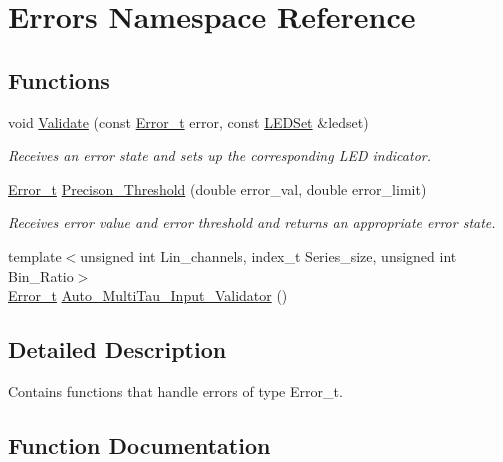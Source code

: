 \hypertarget{namespaceErrors}{}\section{Errors Namespace Reference}
\label{namespaceErrors}
\subsection*{Functions}
\begin{DoxyCompactItemize}
\item 
void \hyperlink{namespaceErrors_a8f082a1fb43d231480a51452d20a60ad}{Validate} (const \hyperlink{errors_8hpp_a4e8c0d09726859e3d3369c0da5a1aa7f}{Error\+\_\+t} error, const \hyperlink{classLEDSet}{L\+E\+D\+Set} \&ledset)
\begin{DoxyCompactList}\small\item\em Receives an error state and sets up the corresponding L\+ED indicator. \end{DoxyCompactList}\item 
\hyperlink{errors_8hpp_a4e8c0d09726859e3d3369c0da5a1aa7f}{Error\+\_\+t} \hyperlink{namespaceErrors_a13171d3d324164c9f7a9508d5a16b0c5}{Precison\+\_\+\+Threshold} (double error\+\_\+val, double error\+\_\+limit)
\begin{DoxyCompactList}\small\item\em Receives error value and error threshold and returns an appropriate error state. \end{DoxyCompactList}\item 
{\footnotesize template$<$unsigned int Lin\+\_\+channels, index\+\_\+t Series\+\_\+size, unsigned int Bin\+\_\+\+Ratio$>$ }\\\hyperlink{errors_8hpp_a4e8c0d09726859e3d3369c0da5a1aa7f}{Error\+\_\+t} \hyperlink{namespaceErrors_a7010d07de8236f9a17b302c78f37483e}{Auto\+\_\+\+Multi\+Tau\+\_\+\+Input\+\_\+\+Validator} ()
\end{DoxyCompactItemize}


\subsection{Detailed Description}
Contains functions that handle errors of type {\ttfamily Error\+\_\+t}. 

\subsection{Function Documentation}
\mbox{\label{namespaceErrors_a7010d07de8236f9a17b302c78f37483e}} 
